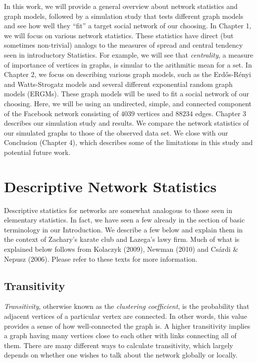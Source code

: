 \documentclass[12pt,twoside]{amherstthesis}
\begin{document}
  In this work, we will provide a general overview about network
  statistics and graph models, followed by a simulation study that tests
  different graph models and see how well they ``fit'' a target social
  network of our choosing. In Chapter 1, we will focus on various network
  statistics. These statistics have direct (but sometimes non-trivial)
  analogs to the measures of spread and central tendency seen in
  introductory Statistics. For example, we will see that
  \emph{centrality}, a measure of importance of vertices in graphs, is
  simular to the arithmitic mean for a set. In Chapter 2, we focus on
  describing various graph models, such as the Erdős-Rényi and
  Watts-Strogatz models and several different exponential random graph
  models (ERGMs). These graph models will be used to fit a social network
  of our choosing. Here, we will be using an undirected, simple, and
  connected component of the Facebook network consisting of \(4039\)
  vertices and \(88234\) edges. Chapter 3 describes our simulation study
  and results. We compare the network statistics of our simulated graphs
  to those of the observed data set. We close with our Conclusion (Chapter
  4), which describes some of the limitations in this study and potential
  future work.
  
  \chapter{Descriptive Network
  Statistics}\label{descriptive-network-statistics}
  
  Descriptive statistics for networks are somewhat analogous to those seen
  in elementary statistics. In fact, we have seen a few already in the
  section of basic terminology in our Introduction. We describe a few
  below and explain them in the context of Zachary's karate club and
  Lazega's lawy firm. Much of what is explained below follows from
  Kolaczyk (2009), Newman (2010) and Csárdi \& Nepusz (2006). Please refer
  to these texts for more information.
  
  \section{Transitivity}\label{transitivity}
  
  \emph{Transitivity}, otherwise known as the \emph{clustering
  coefficient}, is the probability that adjacent vertices of a particular
  vertex are connected. In other words, this value provides a sense of how
  well-connected the graph is. A higher transitivity implies a graph
  having many vertices close to each other with links connecting all of
  them. There are many different ways to calculate transitivity, which
  largely depends on whether one wishes to talk about the network globally
  or locally.
  
\end{document}
